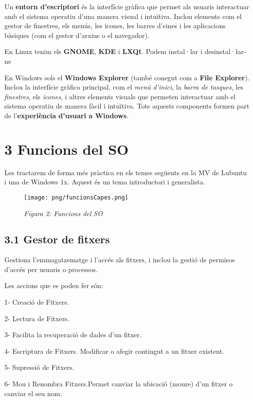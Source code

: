 \documentclass[
  a4paper,
]{article}
\begin{document}
Un \textbf{entorn d'escriptori} és la interfície gràfica que permet als
usuaris interactuar amb el sistema operatiu d'una manera visual i
intuïtiva. Inclou elements com el gestor de finestres, els menús, les
icones, les barres d'eines i les aplicacions bàsiques (com el gestor
d'arxius o el navegador).

En Linux tenim els \textbf{GNOME}, \textbf{KDE} i \textbf{LXQt}. Podem
instal·lar i desinstal·lar-ne

En Windows sols el \textbf{Windows Explorer} (també conegut com a
\textbf{File Explorer}). Inclou la interfície gràfica principal, com el
\emph{menú d'inici}, la \emph{barra de tasques}, les \emph{finestres},
els \emph{icones}, i altres elements visuals que permeten interactuar
amb el sistema operatiu de manera fàcil i intuïtiva. Tots aquests
components formen part de l'\textbf{experiència d'usuari a Windows}.

\section{3 Funcions del SO}\label{funcions-del-so}

Les tractarem de forma més pràctica en els temes següents en la MV de
Lubuntu i una de Windows 1x. Aquest és un tema introductori i
generalista.

\begin{figure}
\centering
\texttt{[image: png/funcionsCapes.png]}
\caption{\emph{Figura 2: Funcions del SO}}
\end{figure}

\subsection{3.1 Gestor de fitxers}\label{gestor-de-fitxers}

Gestiona l'emmagatzematge i l'accés als fitxers, i inclou la gestió de
permisos d'accés per usuaris o processos.

Les accions que es poden fer són:

1- Creació de Fitxers.

2- Lectura de Fitxers.

3- Facilita la recuperació de dades d'un fitxer.

4- Escriptura de Fitxers. Modificar o afegir contingut a un fitxer
existent.

5- Supressió de Fitxers.

6- Mou i Renombra Fitxers.Permet canviar la ubicació (moure) d'un fitxer
o canviar el seu nom.
\end{document}
